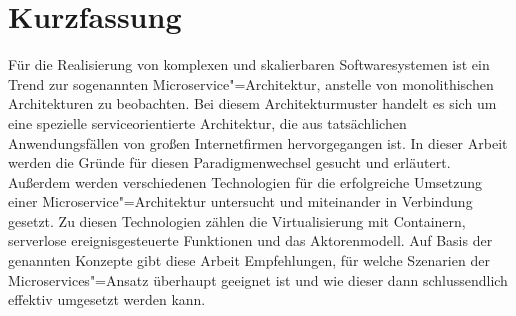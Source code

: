 \chapter{Kurzfassung}

Für die Realisierung von komplexen und skalierbaren Softwaresystemen ist ein Trend zur sogenannten Microservice"=Architektur, anstelle von monolithischen Architekturen zu beobachten. Bei diesem Architekturmuster handelt es sich um eine spezielle serviceorientierte Architektur, die aus tatsächlichen Anwendungsfällen von großen Internetfirmen hervorgegangen ist. In dieser Arbeit werden die Gründe für diesen Paradigmenwechsel gesucht und erläutert. Außerdem werden verschiedenen Technologien für die erfolgreiche Umsetzung einer Microservice"=Architektur untersucht und miteinander in Verbindung gesetzt. Zu diesen Technologien zählen die Virtualisierung mit Containern, serverlose ereignisgesteuerte Funktionen und das Aktorenmodell. Auf Basis der genannten Konzepte gibt diese Arbeit Empfehlungen, für welche Szenarien der Microservices"=Ansatz überhaupt geeignet ist und wie dieser dann schlussendlich effektiv umgesetzt werden kann.